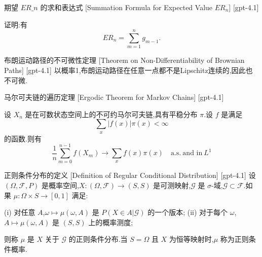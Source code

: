 \documentclass[UTF8]{ctexart}
\begin{document}
    
    
    \begin{thm}
        {期望 $E R\_n$ 的求和表达式}
        [Summation Formula for Expected Value $E R_n$]
        [gpt-4.1]
        
证明:有
\[
E R_{n} = \sum_{m=1}^{n} g_{m-1}.
\]

    \end{thm}
    
    
    
    \begin{thm}
        {布朗运动路径的不可微性定理}
        [Theorem on Non-Differentiability of Brownian Paths]
        [gpt-4.1]
        以概率1,布朗运动路径在任意一点都不是Lipschitz连续的,因此也不可微.
    \end{thm}
    
    
    
    \begin{thm}
        {马尔可夫链的遍历定理}
        [Ergodic Theorem for Markov Chains]
        [gpt-4.1]
        
设 $X_n$ 是在可数状态空间上的不可约马尔可夫链,具有平稳分布 $\pi$.设 $f$ 是满足
\[
\sum_x |f(x)|\pi(x) < \infty
\]
的函数.则有
\[
\frac{1}{n} \sum_{m=0}^{n-1} f(X_m) \to \sum_x f(x)\pi(x) \quad \mathrm{a.s.}~\text{and in}~L^1
\]

    \end{thm}
    
    
    
    \begin{dfn}
        {正则条件分布的定义}
        [Definition of Regular Conditional Distribution]
        [gpt-4.1]
        设 $(\Omega, \mathcal{F}, P)$ 是概率空间,$X: (\Omega, \mathcal{F}) \to (S, S)$ 是可测映射,$\mathcal{G}$ 是 $\sigma$-域,$\mathcal{G} \subset \mathcal{F}$.如果 $\mu: \Omega \times S \to [0,1]$ 满足:

(i) 对任意 $A$,$\omega \mapsto \mu(\omega, A)$ 是 $P(X \in A | \mathcal{G})$ 的一个版本;
(ii) 对于每个 $\omega$,$A \mapsto \mu(\omega, A)$ 是 $(S, S)$ 上的概率测度;

则称 $\mu$ 是 $X$ 关于 $\mathcal{G}$ 的正则条件分布.当 $S = \Omega$ 且 $X$ 为恒等映射时,$\mu$ 称为正则条件概率.

    \end{dfn}
    
    
    
\end{document}
